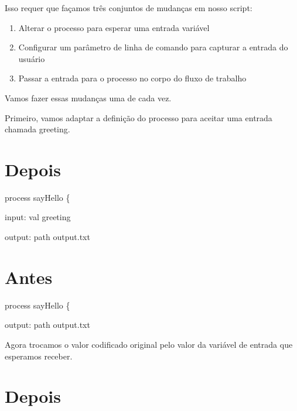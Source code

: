 \documentclass[
  brazilian,
  letterpaper,
  DIV=11,
  numbers=noendperiod]{scrreprt}
\newenvironment{Shaded}{\begin{snugshade}}{\end{snugshade}}
\newcommand{\NormalTok}[1]{\textcolor[rgb]{0.00,0.23,0.31}{#1}}
\newcommand{\OperatorTok}[1]{\textcolor[rgb]{0.37,0.37,0.37}{#1}}
\newcommand{\StringTok}[1]{\textcolor[rgb]{0.13,0.47,0.30}{#1}}
\providecommand{\tightlist}{%
  \setlength{\itemsep}{0pt}\setlength{\parskip}{0pt}}
\begin{document}
Isso requer que façamos três conjuntos de mudanças em nosso script:

\begin{enumerate}
\def\labelenumi{\arabic{enumi}.}
\tightlist
\item
  Alterar o processo para esperar uma entrada variável
\item
  Configurar um parâmetro de linha de comando para capturar a entrada do
  usuário
\item
  Passar a entrada para o processo no corpo do fluxo de trabalho
\end{enumerate}

Vamos fazer essas mudanças uma de cada vez.

Primeiro, vamos adaptar a definição do processo para aceitar uma entrada
chamada greeting.

\section{Depois}

\begin{Shaded}
\begin{Highlighting}[]
\NormalTok{process sayHello }\OperatorTok{\{}

\NormalTok{    input}\OperatorTok{:}
\NormalTok{    val greeting}

\NormalTok{    output}\OperatorTok{:}
\NormalTok{    path }\StringTok{\textquotesingle{}output.txt\textquotesingle{}}
\end{Highlighting}
\end{Shaded}

\section{Antes}

\begin{Shaded}
\begin{Highlighting}[]
\NormalTok{process sayHello }\OperatorTok{\{}

\NormalTok{    output}\OperatorTok{:}
\NormalTok{    path }\StringTok{\textquotesingle{}output.txt\textquotesingle{}}
\end{Highlighting}
\end{Shaded}

Agora trocamos o valor codificado original pelo valor da variável de
entrada que esperamos receber.

\section{Depois}
\end{document}
